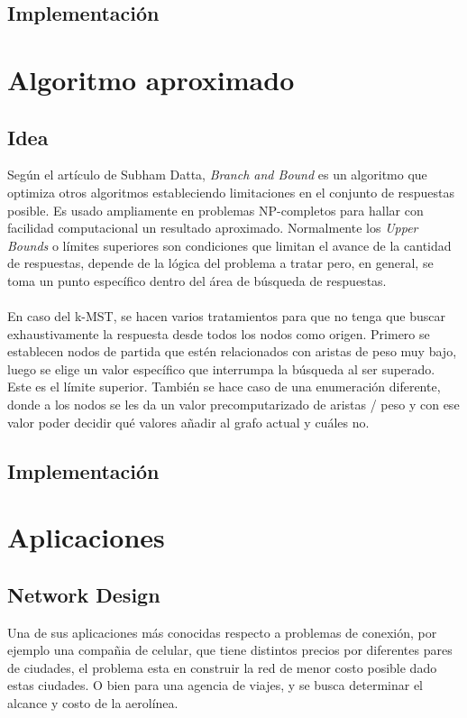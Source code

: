 \documentclass[spanish,12pt]{elsarticle}
\begin{document}
\subsection{Implementación}




\section{Algoritmo aproximado}
\subsection{Idea}
Según el artículo de Subham Datta\cite{1}, \textit{Branch and Bound} es un algoritmo que optimiza otros algoritmos estableciendo limitaciones en el conjunto de respuestas posible. Es usado ampliamente en problemas NP-completos para hallar con facilidad computacional un resultado aproximado. Normalmente los \textit{Upper Bounds} o límites superiores son condiciones que limitan el avance de la cantidad de respuestas, depende de la lógica del problema a tratar pero, en general, se toma un punto específico dentro del área de búsqueda de respuestas.\\\\
En caso del k-MST, se hacen varios tratamientos para que no tenga que buscar exhaustivamente la respuesta desde todos los nodos como origen. Primero se establecen nodos de partida que estén relacionados con aristas de peso muy bajo, luego se elige un valor específico que interrumpa la búsqueda al ser superado. Este es el límite superior. También se hace caso de una enumeración diferente, donde a los nodos se les da un valor precomputarizado de aristas / peso y con ese valor poder decidir qué valores añadir al grafo actual y cuáles no.


\subsection{Implementación}



\section{Aplicaciones}
\subsection{Network Design}
Una de sus aplicaciones más conocidas respecto a problemas de conexión, por ejemplo una compañia de celular, que tiene distintos precios por diferentes pares de ciudades, el problema esta en construir la red de menor costo posible dado estas ciudades. O bien para una agencia de viajes, y se busca determinar el alcance y costo de la aerolínea.
\end{document}
